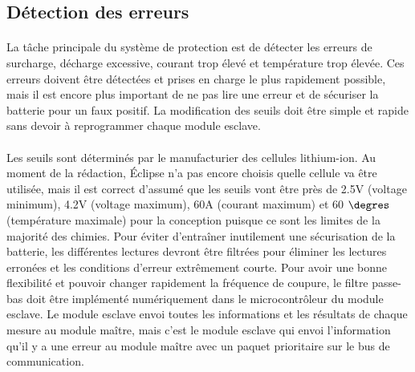 
\subsection{Détection des erreurs}
	\paragraph*{}
	La tâche principale du système de protection est de détecter les erreurs de surcharge, décharge excessive, courant trop élevé et température trop élevée. Ces erreurs doivent être détectées et prises en charge le plus rapidement possible, mais il est encore plus important de ne pas lire une erreur et de sécuriser la batterie pour un faux positif. La modification des seuils doit être simple et rapide sans devoir à reprogrammer chaque module esclave. 

	\paragraph*{}
	Les seuils sont déterminés par le manufacturier des cellules lithium-ion. Au moment de la rédaction, Éclipse n'a pas encore choisis quelle cellule va être utilisée, mais il est correct d'assumé que les seuils vont être près de 2.5V (voltage minimum), 4.2V (voltage maximum), 60A (courant maximum) et 60 $\degres$ (température maximale) pour la conception puisque ce sont les limites de la majorité des chimies. Pour éviter d'entraîner inutilement une sécurisation de la batterie, les différentes lectures devront être filtrées pour éliminer les lectures erronées et les conditions d'erreur extrêmement courte. Pour avoir une bonne flexibilité et pouvoir changer rapidement la fréquence de coupure, le filtre passe-bas doit être implémenté numériquement dans le microcontrôleur du module esclave. Le module esclave envoi toutes les informations et les résultats de chaque mesure au module maître, mais c'est le module esclave qui envoi l'information qu'il y a une erreur au module maître avec un paquet prioritaire sur le bus de communication.
 
 \newpage